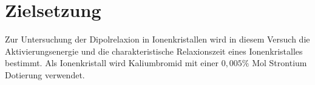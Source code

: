 \section{Zielsetzung}
\label{sec:zielsetzung}
Zur Untersuchung der Dipolrelaxion in Ionenkristallen wird in diesem Versuch die Aktivierungsenergie 
und die charakteristische Relaxionszeit eines Ionenkristalles bestimmt.
Als Ionenkristall wird Kaliumbromid mit einer $0,005 \%$ Mol Strontium Dotierung verwendet. 
